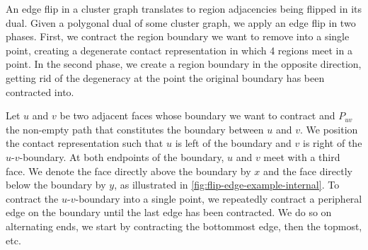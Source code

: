 An edge flip in a cluster graph translates to region adjacencies being flipped in its dual. Given a polygonal dual of some cluster graph, we apply an edge flip in two phases. First, we contract the region boundary we want to remove into a single point, creating a degenerate contact representation in which 4 regions meet in a point. In the second phase, we create a region boundary in the opposite direction, getting rid of the degeneracy at the point the original boundary has been contracted into.


Let $u$ and $v$ be two adjacent faces whose boundary we want to contract and $P_{uv}$ the non-empty path that constitutes the boundary between $u$ and $v$. We position the contact representation such that $u$ is left of the boundary and $v$ is right of the $u$-$v$-boundary. At both endpoints of the boundary, $u$ and $v$ meet with a third face. We denote the face directly above the boundary by $x$ and the face directly below the boundary by $y$, as illustrated in \cref{fig:flip-edge-example-internal}. To contract the $u$-$v$-boundary into a single point, we repeatedly contract a peripheral edge on the boundary until the last edge has been contracted. We do so on alternating ends, \ie{} we start by contracting the bottommost edge, then the topmost, etc.

